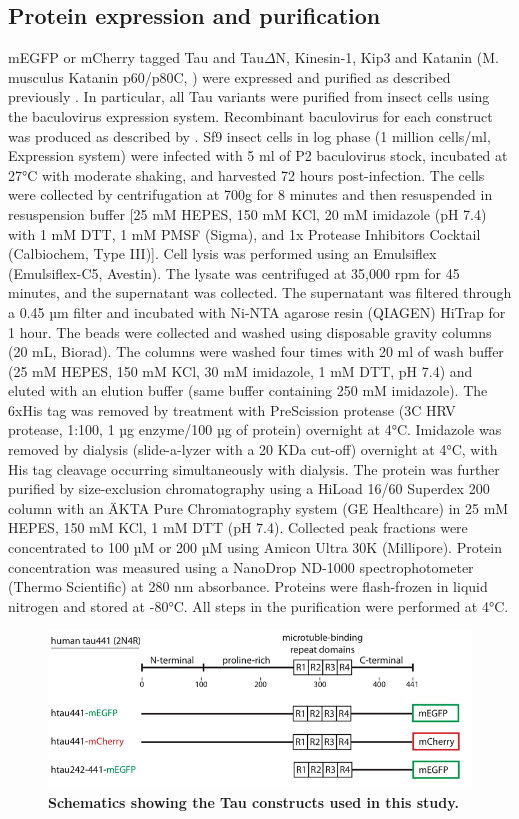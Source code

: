 \subsection{Protein expression and purification} 
mEGFP or mCherry tagged Tau and Tau$\Delta$N, Kinesin-1, Kip3 and Katanin (M. musculus Katanin p60/p80C, \cite{Jiang2017}) were expressed and purified as described previously \parencite{HERNANDEZVEGA20172304,Herrmann2018,Mitra2018,NITZSCHE2010247}. In particular, all Tau variants  were purified from insect cells using the baculovirus expression system. Recombinant baculovirus for each construct was produced as described by \cite{woodruff2015method}. Sf9 insect cells in log phase (1 million cells/ml, Expression system) were infected with 5 ml of P2 baculovirus stock, incubated at 27°C with moderate shaking, and harvested 72 hours post-infection. The cells were collected by centrifugation at 700g for 8 minutes and then resuspended in resuspension buffer [25 mM HEPES, 150 mM KCl, 20 mM imidazole (pH 7.4) with 1 mM DTT, 1 mM PMSF (Sigma), and 1x Protease Inhibitors Cocktail (Calbiochem, Type III)]. Cell lysis was performed using an Emulsiflex (Emulsiflex-C5, Avestin). The lysate was centrifuged at 35,000 rpm for 45 minutes, and the supernatant was collected. The supernatant was filtered through a 0.45 µm filter and incubated with Ni-NTA agarose resin (QIAGEN) HiTrap for 1 hour. The beads were collected and washed using disposable gravity columns (20 mL, Biorad). The columns were washed four times with 20 ml of wash buffer (25 mM HEPES, 150 mM KCl, 30 mM imidazole, 1 mM DTT, pH 7.4) and eluted with an elution buffer (same buffer containing 250 mM imidazole). The 6xHis tag was removed by treatment with PreScission protease (3C HRV protease, 1:100, 1 µg enzyme/100 µg of protein) overnight at 4°C. Imidazole was removed by dialysis (slide-a-lyzer with a 20 KDa cut-off) overnight at 4°C, with His tag cleavage occurring simultaneously with dialysis. The protein was further purified by size-exclusion chromatography using a HiLoad 16/60 Superdex 200 column with an ÄKTA Pure Chromatography system (GE Healthcare) in 25 mM HEPES, 150 mM KCl, 1 mM DTT (pH 7.4). Collected peak fractions were concentrated to 100 µM or 200 µM using Amicon Ultra 30K (Millipore). Protein concentration was measured using a NanoDrop ND-1000 spectrophotometer (Thermo Scientific) at 280 nm absorbance. Proteins were flash-frozen in liquid nitrogen and stored at -80°C. All steps in the purification were performed at 4°C. 

\begin{figure}[h]
	\centering
	\includegraphics[width=0.6\linewidth]{Figures/Tauconstructs.png}
	\caption[Schematics showing the Tau constructs used in this study.]{
		\textbf{Schematics showing the Tau constructs used in this study.}
		}\label{Tauconstructs}
\end{figure}

